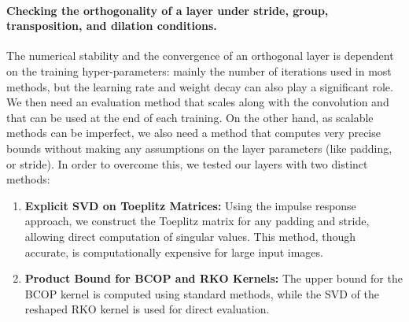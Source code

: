 
    \paragraph{Checking the orthogonality of a layer under stride, group, transposition, and dilation conditions.}
    The numerical stability and the convergence of an orthogonal layer is dependent on the training hyper-parameters: mainly the number of iterations used in most methods, but the learning rate and weight decay can also play a significant role. We then need an evaluation method that scales along with the convolution and that can be used at the end of each training. On the other hand, as scalable methods can be imperfect, we also need a method that computes very precise bounds without making any assumptions on the layer parameters (like padding, or stride). In order to overcome this, we tested our layers with two distinct methods:
    \begin{enumerate}
        \item  \textbf{Explicit SVD on Toeplitz Matrices:} Using the impulse response approach, we construct the Toeplitz matrix for any padding and stride, allowing direct computation of singular values. This method, though accurate, is computationally expensive for large input images. 
        \item \textbf{Product Bound for BCOP and RKO Kernels:} The upper bound for the BCOP kernel is computed using standard methods, while the SVD of the reshaped RKO kernel is used for direct evaluation.
    \end{enumerate}

